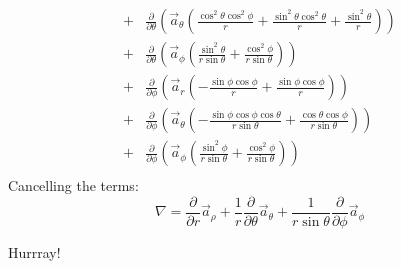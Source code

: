 \begin{align*}
                           + & \frac{\partial}{\partial\theta}\left(
                                    \vec{a}_\theta\left(
                                        \frac{\cos^2\theta\cos^2\phi}{r} + 
                                        \frac{\sin^2\theta\cos^2\theta}{r} +
                                        \frac{\sin^2\theta}{r}
                                    \right) 
                                \right) \\
                           + & \frac{\partial}{\partial\theta}\left(
                                    \vec{a}_\phi\left(
                                        \frac{\sin^2\theta}{r\sin\theta} + 
                                        \frac{\cos^2\phi}{r\sin\theta}
                                    \right) 
                                \right) \\
                           + & \frac{\partial}{\partial\phi}\left(
                                    \vec{a}_r\left(
                                        -\frac{\sin\phi\cos\phi}{r}
                                        +\frac{\sin\phi\cos\phi}{r}
                                    \right)
                                \right) \\
                           + & \frac{\partial}{\partial\phi}\left(
                                    \vec{a}_\theta\left(
                                        -\frac{\sin\phi\cos\phi\cos\theta}{r\sin\theta}
                                        +\frac{\cos\theta\cos\phi}{r\sin\theta}
                                    \right)
                                \right) \\
                           + & \frac{\partial}{\partial\phi}\left(
                                    \vec{a}_\phi\left(
                                        \frac{\sin^2\phi}{r\sin\theta} + 
                                        \frac{\cos^2\phi}{r\sin\theta}
                                    \right)
                                \right) \\
                \end{align*}
                Cancelling the terms:
                \begin{equation*}
                    \nabla = \frac{\partial}{\partial r}\vec{a}_\rho + \frac{1}{r}\frac{\partial}{\partial \theta}\vec{a}_\theta + \frac{1}{r\sin\theta}\frac{\partial}{\partial\phi}\vec{a}_\phi
                \end{equation*}
                \begin{center}
                    \begin{huge}
                        Hurrray!
                    \end{huge}
                \end{center}